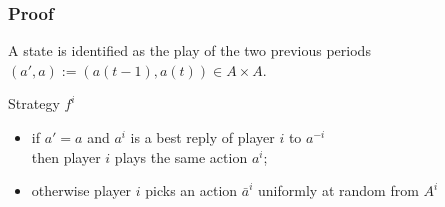 \documentclass{beamer}
\begin{document}
\begin{frame}
    \frametitle{Proof}
    \begin{definition}[State]
        A state is identified as the play of the two previous periods $(a', a) := (a(t-1), a(t)) \in A \times A$.
    \end{definition}
    \pause
    \begin{exampleblock}{Strategy $f^i$}
        \begin{itemize}
            \item if $a' = a$ and $a^i$ is a best reply of player $i$ to $a^{-i}$\\
                then player $i$ plays the same action $a^i$;
            \item otherwise player $i$ picks an action $\bar{a}^i$ uniformly at random from $A^i$
        \end{itemize}
    \end{exampleblock}
\end{frame}
\end{document}
